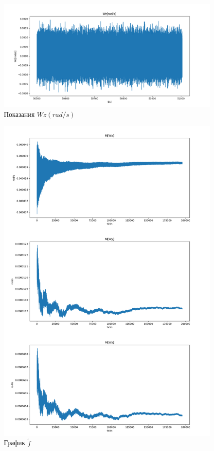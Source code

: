 \documentclass[a4paper,14pt]{article}
\theoremstyle{plain} %
\theoremstyle{definition} %
\theoremstyle{remark} %
\begin{document}
{\begin{figure}[h!]
    \centering
    \includegraphics[width=0.99\linewidth]{Wz.png}
    \caption{Показания $Wz(rad/s)$}
    \label{fig:wz}
\end{figure}
\begin{figure}[h!]
    \centering
    \includegraphics[width=0.99\linewidth]{FullW.png}
    \caption{ График $\widetilde{f}$}
    \label{fig:ma}
\end{figure}

}
\end{document}
